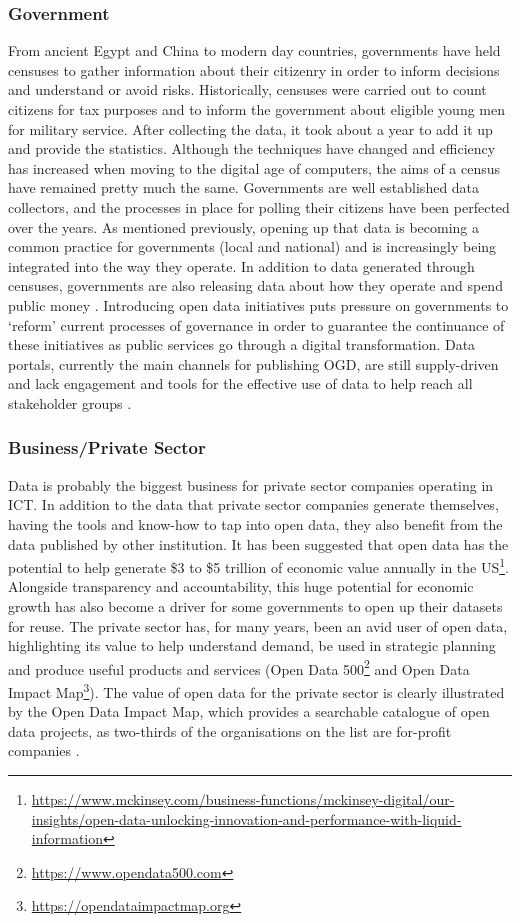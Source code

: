 \subsubsection{Government}
From ancient Egypt and China to modern day countries, governments have held censuses to gather information about their citizenry in order to inform decisions and understand or avoid risks. Historically, censuses were carried out to count citizens for tax purposes and to inform the government about eligible young men for military service. After collecting the data, it took about a year to add it up and provide the statistics. Although the techniques have changed and efficiency has increased when moving to the digital age of computers, the aims of a census have remained pretty much the same. Governments are well established data collectors, and the processes in place for polling their citizens have been perfected over the years. As mentioned previously, opening up that data is becoming a common practice for governments (local and national) and is increasingly being integrated into the way they operate. In addition to data generated through censuses, governments are also releasing data about how they operate and spend public money \citep{marshall_accountable:_2016}. Introducing open data initiatives puts pressure on governments to `reform' current processes of governance in order to guarantee the continuance of these initiatives as public services go through a digital transformation. Data portals, currently the main channels for publishing OGD, are still supply-driven and lack engagement and tools for the effective use of data to help reach all stakeholder groups \citep[sec. 3]{davies_state_2019}.

\subsubsection{Business/Private Sector}
Data is probably the biggest business for private sector companies operating in ICT. In addition to the data that private sector companies generate themselves, having the tools and know-how to tap into open data, they also benefit from the data published by other institution. It has been suggested that open data has the potential to help generate \$3 to \$5 trillion of economic value annually in the US\footnote{\url{https://www.mckinsey.com/business-functions/mckinsey-digital/our-insights/open-data-unlocking-innovation-and-performance-with-liquid-information}}. Alongside transparency and accountability, this huge potential for economic growth has also become a driver for some governments to open up their datasets for reuse. The private sector has, for many years, been an avid user of open data, highlighting its value to help understand demand, be used in strategic planning and produce useful products and services (Open Data 500\footnote{\url{https://www.opendata500.com}} and Open Data Impact Map\footnote{\url{https://opendataimpactmap.org}}). The value of open data for the private sector is clearly illustrated by the Open Data Impact Map, which provides a searchable catalogue of open data projects, as two-thirds of the organisations on the list are for-profit companies \citep{gurin_open_2019}.

